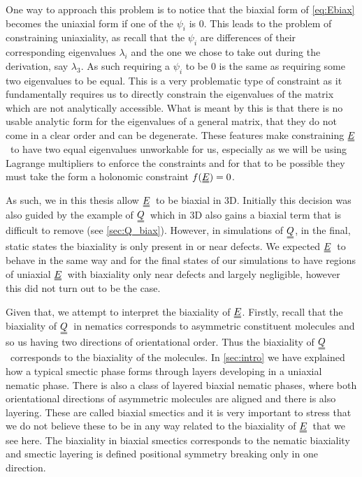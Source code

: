 \documentclass[12pt]{article}
\newcommand{\duf}[2]{\stackunder[0.5pt]{\stackunder[0.8pt]{\stackunder[1pt]{\ensuremath{#1}}{\rule{\widthof{\ensuremath{#2}}*\real{0.9}}{.1ex}}}{\rule{\widthof{\ensuremath{#2}}*\real{0.9}}{.1ex}}}{}}
\newcommand{\du}[1]{\duf{#1}{#1}}
\newcommand{\QQ}{\ensuremath{\du{Q}}}
\newcommand{\EE}{\ensuremath{\du{E}}}
\begin{document}
        One way to approach this problem is to notice that the biaxial form of \cref{eq:Ebiax} becomes the uniaxial form if one of the $\psi_i$ is 0.
        This leads to the problem of constraining uniaxiality, as recall that the $\psi_i$ are differences of their corresponding eigenvalues $\lambda_i$ and the one we chose to take out during the derivation, say $\lambda_3$.
        As such requiring a $\psi_i$ to be 0 is the same as requiring some two eigenvalues to be equal.
        This is a very problematic type of constraint as it fundamentally requires us to directly constrain the eigenvalues of the matrix which are not analytically accessible.
        What is meant by this is that there is no usable analytic form for the eigenvalues of a general matrix, that they do not come in a clear order and can be degenerate.
        These features make constraining \EE\ to have two equal eigenvalues unworkable for us, especially as we will be using Lagrange multipliers to enforce the constraints and for that to be possible they must take the form a holonomic constraint $f(\du{E}) = 0$.

        As such, we in this thesis allow \EE\ to be biaxial in 3D.
        Initially this decision was also guided by the example of \QQ\ which in 3D also gains a biaxial term that is difficult to remove (see \cref{sec:Q_biax}).
        However, in simulations of \QQ, in the final, static states the biaxiality is only present in or near defects.
        We expected \EE\ to behave in the same way and for the final states of our simulations to have regions of uniaxial \EE\ with biaxiality only near defects and largely negligible, however this did not turn out to be the case.

        Given that, we attempt to interpret the biaxiality of \EE.
        Firstly, recall that the biaxiality of \QQ\ in nematics corresponds to asymmetric constituent molecules and so us having two directions of orientational order.
        Thus the biaxiality of \QQ\ corresponds to the biaxiality of the molecules.
        In \cref{sec:intro} we have explained how a typical smectic phase forms through layers developing in a uniaxial nematic phase.
        There is also a class of layered biaxial nematic phases, where both orientational directions of asymmetric molecules are aligned and there is also layering.
        These are called biaxial smectics\cite{k.sadashivaBiaxialSmecticPhase2002,semmlerBiaxialSmecticPhases1998} and it is very important to stress that we do not believe these to be in any way related to the biaxiality of \EE\ that we see here.
        The biaxiality in biaxial smectics corresponds to the nematic biaxiality and smectic layering is defined positional symmetry breaking only in one direction.
\end{document}
